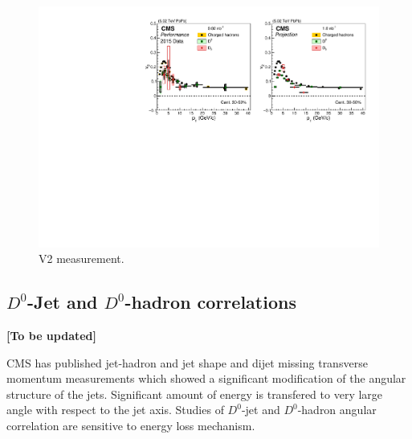 \begin{figure}[!ht]
\begin{center}
\includegraphics[width=.98\textwidth]{figures/cV2_lumiMB_1.pdf}
\caption{V2 measurement.}
\label{fig:v2_projection}
\end{center}
\end{figure}



\subsection{$D^0$-Jet and $D^0$-hadron correlations}
{\bf [To be updated]}

CMS has published jet-hadron and jet shape and dijet missing transverse momentum measurements which showed a significant modification of the angular structure of the jets. Significant amount of energy is transfered to very large angle with respect to the jet axis.
Studies of $D^0$-jet and $D^0$-hadron angular correlation are sensitive to energy loss mechanism. 

